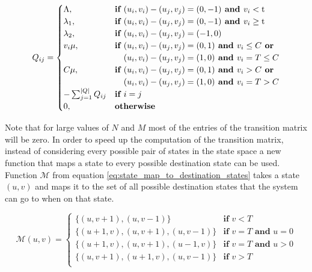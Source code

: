 \begin{equation} \label{eq:markov_transition_rate}
    Q_{ij} =
    \begin{cases}
        \Lambda, & \textbf{if } (u_i, v_i) - (u_j, v_j) = (0,-1) \textbf{ and }
        v_i < \text{t} \\
        \lambda_1, & \textbf{if } (u_i, v_i) - (u_j, v_j) = (0,-1)
        \textbf{ and } v_i \geq \text{t} \\
        \lambda_2, & \textbf{if } (u_i, v_i) - (u_j, v_j) = (-1,0) \\
        v_i \mu, & \textbf{if } (u_i, v_i) - (u_j, v_j) = (0,1) \textbf{ and }
        v_i \leq C \textbf{ or} \\ & \hspace{0.37cm}(u_i, v_i) - (u_j, v_j) =
        (1,0) \textbf{ and } v_i = T \leq C \\
        C \mu, & \textbf{if } (u_i, v_i) - (u_j, v_j) = (0,1) \textbf{ and }
        v_i > C
        \textbf{ or} \\ & \hspace{0.37cm}(u_i, v_i) - (u_j, v_j) = (1,0)
        \textbf{ and } v_i = T > C\\
        -\sum_{j=1}^{|Q|}{Q_{ij}} & \textbf{if } i = j \\
        0, & \textbf{otherwise}
    \end{cases}
\end{equation}

Note that for large values of \(N\) and \(M\) most of the entries of the
transition matrix will be zero.
In order to speed up the computation of the transition matrix, instead of
considering every possible pair of states in the state space a new function
that maps a state to every possible destination state can be used.
Function \(\mathcal{M}\) from equation \ref{eq:state_map_to_destination_states}
takes a state \((u, v)\) and maps it to the set of
all possible destination states that the system can go to when on that state.

\begin{equation}\label{eq:state_map_to_destination_states}
    \mathcal{M}(u, v) =
    \begin{cases}
        \{(u, v + 1), (u, v - 1)\} & \textbf{if } v < T \\
        \{(u + 1, v), (u, v + 1), (u, v - 1)\} & \textbf{if } v = T
        \textbf{ and } u = 0 \\
        \{(u + 1, v), (u, v + 1), (u - 1, v)\} & \textbf{if } v = T
        \textbf{ and } u > 0 \\
        \{(u, v + 1), (u + 1, v), (u, v - 1)\} & \textbf{if } v > T \\
    \end{cases}
\end{equation}


